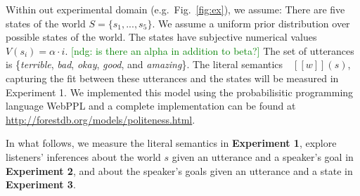 \documentclass[10pt,letterpaper]{article}
\newcommand{\denote}[1]{\mbox{ $[\![ #1 ]\!]$}}
\newcommand{\ndg}[1]{\textcolor{Green}{[ndg: #1]}}
\newcommand{\mht}[1]{\textcolor{DarkOrange}{[mht: #1]}}
\newcommand{\ejy}[1]{\textcolor{Blue}{[ejy: #1]}}
\begin{document}
%

Within out experimental domain (e.g.~Fig.~\ref{fig:ex}), we assume: There are five states of the world $S = \{s_{1}, ...,  s_{5}\}$.
We assume a uniform prior distribution over possible states of the world.
The states have subjective numerical values $V(s_{i}) = \alpha \cdot i$. \ndg{is there an alpha in addition to beta?}
The set of utterances is \{\emph{terrible}, \emph{bad}, \emph{okay}, \emph{good}, and \emph{amazing}\}.
The literal semantics $\denote{w}(s)$, capturing the fit between these utterances and the states will be measured in Experiment 1.
We implemented this model using the probabilisitic programming language WebPPL \cite{dippl} and a complete implementation can be found at \url{http://forestdb.org/models/politeness.html}.

In what follows, we measure the literal semantics in \textbf{Experiment 1}, explore listeners' inferences about the world $s$ given an utterance and a speaker's goal in \textbf{Experiment 2}, and about the speaker's goals given an utterance and a state in \textbf{Experiment 3}.


%
\end{document}
